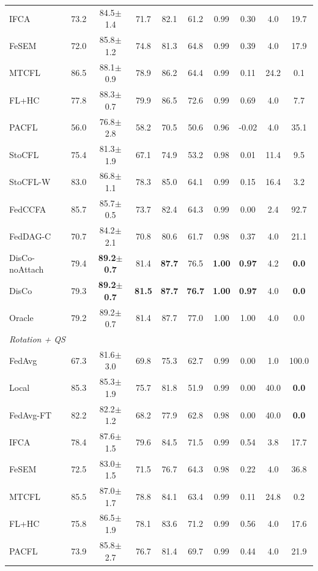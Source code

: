 {\begin{tabular}{lccccccccc}
IFCA & 73.2 & 84.5$\pm$1.4 & 71.7 & 82.1 & 61.2 & 0.99 & 0.30 & 4.0 & 19.7 \\
FeSEM & 72.0 & 85.8$\pm$1.2 & 74.8 & 81.3 & 64.8 & 0.99 & 0.39 & 4.0 & 17.9 \\
MTCFL & 86.5 & 88.1$\pm$0.9 & 78.9 & 86.2 & 64.4 & 0.99 & 0.11 & 24.2 & 0.1 \\
FL+HC & 77.8 & 88.3$\pm$0.7 & 79.9 & 86.5 & 72.6 & 0.99 & 0.69 & 4.0 & 7.7 \\
PACFL & 56.0 & 76.8$\pm$2.8 & 58.2 & 70.5 & 50.6 & 0.96 & -0.02 & 4.0 & 35.1 \\
StoCFL & 75.4 & 81.3$\pm$1.9 & 67.1 & 74.9 & 53.2 & 0.98 & 0.01 & 11.4 & 9.5 \\
StoCFL-W & 83.0 & 86.8$\pm$1.1 & 78.3 & 85.0 & 64.1 & 0.99 & 0.15 & 16.4 & 3.2 \\
FedCCFA & 85.7 & 85.7$\pm$0.5 & 73.7 & 82.4 & 64.3 & 0.99 & 0.00 & 2.4 & 92.7 \\
FedDAG-C & 70.7 & 84.2$\pm$2.1 & 70.8 & 80.6 & 61.7 & 0.98 & 0.37 & 4.0 & 21.1 \\
DisCo-noAttach & 79.4 & \textbf{89.2$\pm$0.7} & 81.4 & \textbf{87.7} & 76.5 & \textbf{1.00} & \textbf{0.97} & 4.2 & \textbf{0.0} \\
DisCo & 79.3 & \textbf{89.2$\pm$0.7} & \textbf{81.5} & \textbf{87.7} & \textbf{76.7} & \textbf{1.00} & \textbf{0.97} & 4.0 & \textbf{0.0} \\
Oracle & 79.2 & 89.2$\pm$0.7 & 81.4 & 87.7 & 77.0 & 1.00 & 1.00 & 4.0 & 0.0 \\
\midrule
\multicolumn{10}{l}{\textit{Rotation + QS}}\\
FedAvg & 67.3 & 81.6$\pm$3.0 & 69.8 & 75.3 & 62.7 & 0.99 & 0.00 & 1.0 & 100.0 \\
Local & 85.3 & 85.3$\pm$1.9 & 75.7 & 81.8 & 51.9 & 0.99 & 0.00 & 40.0 & \textbf{0.0} \\
FedAvg-FT & 82.2 & 82.2$\pm$1.2 & 68.2 & 77.9 & 62.8 & 0.98 & 0.00 & 40.0 & \textbf{0.0} \\
IFCA & 78.4 & 87.6$\pm$1.5 & 79.6 & 84.5 & 71.5 & 0.99 & 0.54 & 3.8 & 17.7 \\
FeSEM & 72.5 & 83.0$\pm$1.5 & 71.5 & 76.7 & 64.3 & 0.98 & 0.22 & 4.0 & 36.8 \\
MTCFL & 85.5 & 87.0$\pm$1.7 & 78.8 & 84.1 & 63.4 & 0.99 & 0.11 & 24.8 & 0.2 \\
FL+HC & 75.8 & 86.5$\pm$1.9 & 78.1 & 83.6 & 71.2 & 0.99 & 0.56 & 4.0 & 17.6 \\
PACFL & 73.9 & 85.8$\pm$2.7 & 76.7 & 81.4 & 69.7 & 0.99 & 0.44 & 4.0 & 21.9 \\

\end{tabular}}
